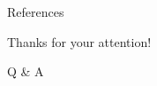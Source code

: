 \documentclass[aspectratio=169,serif]{beamer} %
\begin{document}





\renewcommand\refname{References} 
\begin{frame}[allowframebreaks]{References}
  
  
\end{frame}

\begin{frame}
  \begin{center}
    {\Huge\calligra Thanks for your attention!}
    \vspace{1cm}

    {\Huge Q \& A}
  \end{center}
\end{frame}

\end{document}
